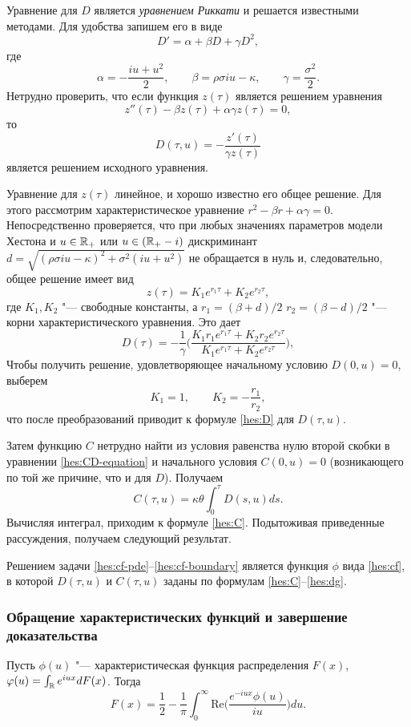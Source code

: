 Уравнение для $D$ является \emph{уравнением Риккати} и решается известными методами.
Для удобства запишем его в виде
\[
D'= \alpha + \beta D + \gamma D^2,
\]
где
\[
\alpha = -\frac{iu + u^2}{2},\qquad \beta = \rho\sigma iu - \kappa, \qquad
\gamma = \frac{\sigma^2}{2}.
\]
Нетрудно проверить, что если функция $z(\tau)$ является решением уравнения
\[
z''(\tau) - \beta z(\tau) + \alpha\gamma z(\tau)= 0,
\]
то
\[
D(\tau,u) = -\frac{z'(\tau)}{\gamma z(\tau)} 
\]
является решением исходного уравнения.

Уравнение для $z(\tau)$ линейное, и хорошо известно его общее решение.
Для этого рассмотрим характеристическое уравнение $r^2-\beta r+\alpha\gamma = 0$.
Непосредственно проверяется, что при любых значениях параметров модели Хестона и $u\in\mathbb{R}_+$ или $u\in(\mathbb{R}_+-i)$ дискриминант $d = \sqrt{(\rho\sigma iu - \kappa)^2 + \sigma^2(iu + u^2)}$ не обращается в нуль и, следовательно, общее решение имеет вид
\[
z(\tau) = K_1 e^{r_1\tau} + K_2 e^{r_2\tau},
\]
где $K_1,K_2$ "--- свободные константы, а $r_1=(\beta+d)/2$ $r_2=(\beta-d)/2$ "--- корни характеристического уравнения.
Это дает
\[
D(\tau) = -\frac1\gamma \biggl(\frac{K_1 r_1 e^{r_1\tau} + K_2 r_2e^{r_2\tau}}{K_1 e^{r_1\tau} + K_2e^{r_2\tau}} \biggr),
\]
Чтобы получить решение, удовлетворяющее начальному условию $D(0,u)=0$, выберем
\[
K_1 = 1, \qquad K_2 = -\frac{r_1}{r_2},
\]
что после преобразований приводит к формуле \eqref{hes:D} для $D(\tau, u)$.

Затем функцию $C$ нетрудно найти из условия равенства нулю второй скобки в уравнении \eqref{hes:CD-equation} и начального условия $C(0,u)=0$ (возникающего по той же причине, что и для $D$).
Получаем
\[
C(\tau, u) = \kappa\theta \int_0^\tau D(s,u) ds.
\]
Вычисляя интеграл, приходим к формуле \eqref{hes:C}.
Подытоживая приведенные рассуждения, получаем следующий результат.

\begin{lemma}
Решением задачи \eqref{hes:cf-pde}--\eqref{hes:cf-boundary} является функция $\phi$ вида \eqref{hes:cf}, в которой $D(\tau,u)$ и $C(\tau,u)$ заданы по формулам \eqref{hes:C}--\eqref{hes:dg}.
\end{lemma}


\subsubsection{Обращение характеристических функций и завершение доказательства}

\begin{lemma} 
Пусть $\phi(u)$ "--- характеристическая функция распределения $F(x)$, \te\ $\varphi(u) = \int_{\mathbb{R}} e^{iu x} d F(x)$.
Тогда
\[
F(x) = \frac 12 - \frac1\pi 
\int_0^\infty \mathrm{Re}\biggl(\frac{e^{-iu x}\phi(u )}{iu}\biggr) d u.
\]
\end{lemma}

